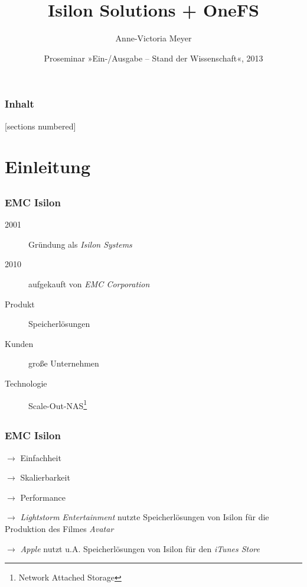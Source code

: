 \documentclass{beamer}
\title{Isilon Solutions + OneFS}
\author{Anne-Victoria Meyer}
\institute{Universität Hamburg}
\date{Proseminar »Ein-/Ausgabe – Stand der Wissenschaft«, 2013}
\begin{document}
\frame{\titlepage}

\begin{frame}
  \frametitle{Inhalt}
  \setcounter{tocdepth}{1}
  [sections numbered]
  \tableofcontents
\end{frame}


\section{Einleitung}

\subsection{}
\begin{frame}[fragile]
  \frametitle{EMC Isilon}
  \begin{description}
    \item[2001] Gründung als \emph{Isilon Systems}
    \item[2010] aufgekauft von \emph{EMC Corporation}
    \item[] 
    \item[Produkt]Speicherlösungen
    \item[Kunden]große Unternehmen
    \item[Technologie]Scale-Out-NAS\footnote{Network Attached Storage}          
  \end{description}

\end{frame}

\subsection{}
\begin{frame}[fragile]
  \frametitle{EMC Isilon}
\begin{description}         
    \item[Leitwerte] $\rightarrow$ Einfachheit
    \item $\rightarrow$ Skalierbarkeit
    \item $\rightarrow$ Performance
    \item[]
    \item[Beispiele] $\rightarrow$ \emph{Lightstorm Entertainment} nutzte Speicherlösungen von Isilon für die Produktion des Filmes \emph{Avatar}
    \item $\rightarrow$ \emph{Apple} nutzt u.A. Speicherlösungen von Isilon für den \emph{iTunes Store}
  \end{description}

\end{frame}
\end{document}
